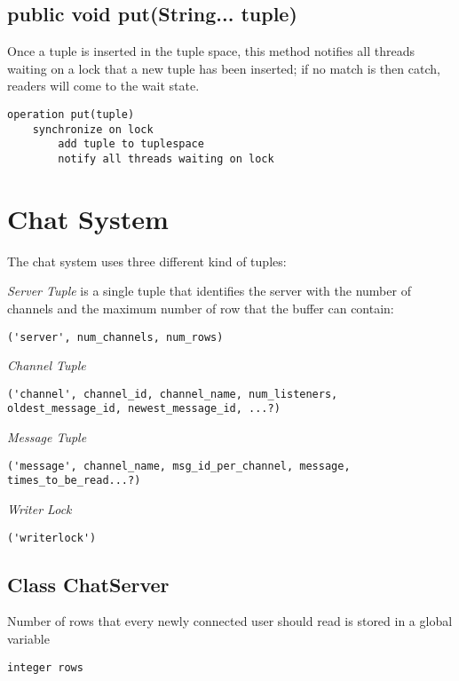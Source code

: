 \documentclass[10pt,a4paper]{article}
\begin{document}
\subsection{public void put(String... tuple)}

Once a tuple is inserted in the tuple space, this method notifies all threads waiting on a lock that a new tuple has been inserted; if no match is then catch, readers will come to the wait state.

\begin{verbatim}
operation put(tuple)
	synchronize on lock
		add tuple to tuplespace
		notify all threads waiting on lock
\end{verbatim}

\section{Chat System}

The chat system uses three different kind of tuples:

\textit{Server Tuple} is a single tuple that identifies the server with the number of channels and the maximum number of row that the buffer can contain:
\begin{verbatim}
('server', num_channels, num_rows)
\end{verbatim}

\textit{Channel Tuple} 
\begin{verbatim}
('channel', channel_id, channel_name, num_listeners, oldest_message_id, newest_message_id, ...?)
\end{verbatim}

\textit{Message Tuple}
\begin{verbatim}
('message', channel_name, msg_id_per_channel, message, times_to_be_read...?)
\end{verbatim}

\textit{Writer Lock}
\begin{verbatim}
('writerlock')
\end{verbatim}

\subsection{Class ChatServer}

Number of rows that every newly connected user should read is stored in a global variable
\begin{verbatim}
integer rows
\end{verbatim}
\end{document}
